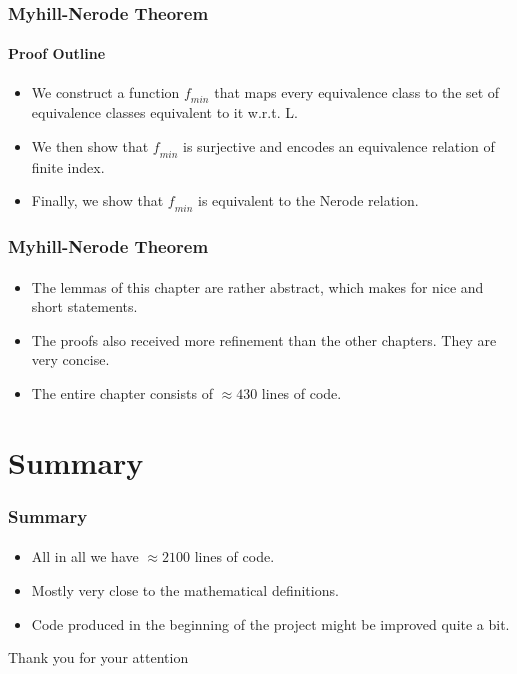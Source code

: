 \documentclass{beamer}
\begin{document}
\begin{frame}
    \frametitle{Myhill-Nerode Theorem}
    \framesubtitle{Proof Outline}
    \begin{itemize}
        \item We construct a function $\mathit{f_{min}}$ that maps every equivalence class to the set of equivalence classes equivalent to it w.r.t. L.
        \item We then show that $\mathit{f_{min}}$ is surjective and encodes an equivalence relation of finite index.
        \item Finally, we show that $\mathit{f_{min}}$ is equivalent to the Nerode relation.
    \end{itemize}
\end{frame}

\begin{frame}
    \frametitle{Myhill-Nerode Theorem}
    \framesubtitle{}
    \begin{itemize}
        \item The lemmas of this chapter are rather abstract, which makes for nice and short statements.
        \item The proofs also received more refinement than the other chapters. They are very concise.
        \item The entire chapter consists of $\approx 430$ lines of code.
    \end{itemize}
\end{frame}

\section{Summary}
\begin{frame}
    \frametitle{Summary}
    \framesubtitle{}
    \begin{itemize}
        \item All in all we have $\approx 2100$ lines of code.  %
        \item Mostly very close to the mathematical definitions.
        \item Code produced in the beginning of the project might be improved quite a bit.
    \end{itemize}
\end{frame}



\begin{frame}
    \begin{center}
        \huge Thank you for your attention
    \end{center}
\end{frame}

%    
\end{document}
